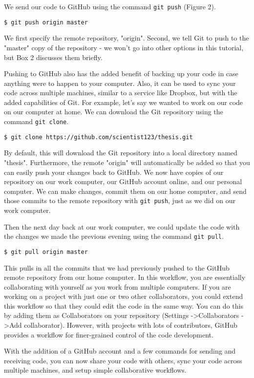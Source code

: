 We send our code to GitHub using the command \verb|git push| (Figure 2).

\begin{lstlisting}
$ git push origin master
\end{lstlisting}

We first specify the remote repository, "origin".
Second, we tell Git to push to the "master" copy of the repository - we won’t go into other options in this tutorial, but Box 2 discusses them briefly.

Pushing to GitHub also has the added benefit of backing up your code in case anything were to happen to your computer.
Also, it can be used to sync your code across multiple machines, similar to a service like Dropbox, but with the added capabilities of Git.
For example, let's say we wanted to work on our code on our computer at home.
We can download the Git repository using the command \verb|git clone|.

\begin{lstlisting}
$ git clone https://github.com/scientist123/thesis.git
\end{lstlisting}

By default, this will download the Git repository into a local directory named "thesis".
Furthermore, the remote "origin" will automatically be added so that you can easily push your changes back to GitHub.
We now have copies of our repository on our work computer, our GitHub account online, and our personal computer.
We can make changes, commit them on our home computer, and send those commits to the remote repository with \verb|git push|, just as we did on our work computer.

Then the next day back at our work computer, we could update the code with the changes we made the previous evening using the command \verb|git pull|.

\begin{lstlisting}
$ git pull origin master
\end{lstlisting}

This pulls in all the commits that we had previously pushed to the GitHub remote repository from our home computer.
In this workflow, you are essentially collaborating with yourself as you work from multiple computers.
If you are working on a project with just one or two other collaborators, you could extend this workflow so that they could edit the code in the same way.
You can do this by adding them as Collaborators on your repository (Settings -\textgreater Collaborators -\textgreater Add collaborator).
However, with projects with lots of contributors, GitHub provides a workflow for finer-grained control of the code development.

With the addition of a GitHub account and a few commands for sending and receiving code, you can now share your code with others, sync your code across multiple machines, and setup simple collaborative workflows.